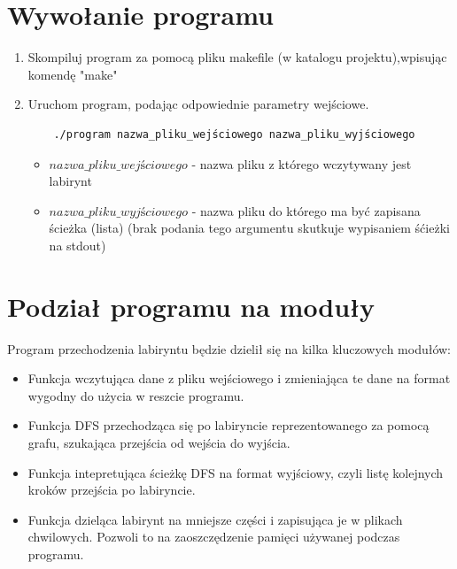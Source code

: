 \documentclass{article}
\begin{document}
\section{Wywołanie programu}

\begin{enumerate}
    \item Skompiluj program za pomocą pliku makefile (w katalogu projektu),\newline wpisując komendę "make"
 
    \item Uruchom program, podając odpowiednie parametry wejściowe.
    \begin{verbatim}
    ./program nazwa_pliku_wejściowego nazwa_pliku_wyjściowego
    \end{verbatim}
    \begin{itemize}
    \item $nazwa\_ pliku\_wejściowego$ - nazwa pliku z którego wczytywany jest labirynt
    \item $nazwa\_ pliku\_wyjściowego$ - nazwa pliku do którego ma być zapisana ścieżka (lista) (brak podania tego argumentu skutkuje wypisaniem śćieżki na stdout)
    \end{itemize}
    
\end{enumerate}



\section{Podział programu na moduły}

Program przechodzenia labiryntu będzie dzielił się na kilka kluczowych modułów:

\begin{itemize}
\item Funkcja wczytująca dane z pliku wejściowego i zmieniająca te dane na format wygodny do użycia w reszcie programu.
\item Funkcja DFS przechodząca się po labiryncie reprezentowanego za pomocą grafu, szukająca przejścia od wejścia do wyjścia.
\item Funkcja intepretująca ścieżkę DFS na format wyjściowy, czyli listę kolejnych kroków przejścia po labiryncie.
\item Funkcja dzieląca labirynt na mniejsze części i zapisująca je w plikach chwilowych. Pozwoli to na zaoszczędzenie pamięci używanej podczas programu.
\end{itemize}
\end{document}
